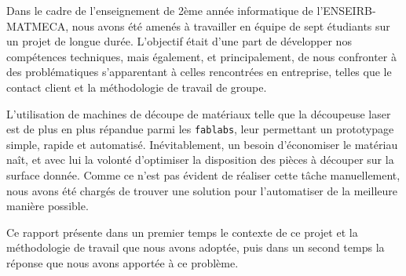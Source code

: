 
Dans le cadre de l'enseignement de 2ème année informatique de l'ENSEIRB-MATMECA, nous avons été amenés à travailler en équipe de sept étudiants sur un projet de longue durée. L'objectif était d'une part de développer nos compétences techniques, mais également, et principalement, de nous confronter à des problématiques s'apparentant à celles rencontrées en entreprise, telles que le contact client et la méthodologie de travail de groupe.

L'utilisation de machines de découpe de matériaux telle que la découpeuse laser est de plus en plus répandue parmi les \texttt{fablabs}, leur permettant un prototypage simple, rapide et automatisé. Inévitablement, un besoin d'économiser le matériau naît, et avec lui la volonté d'optimiser la disposition des pièces à découper sur la surface donnée. Comme ce n'est pas évident de réaliser cette tâche manuellement, nous avons été chargés de trouver une solution pour l'automatiser de la meilleure manière possible.

Ce rapport présente dans un premier temps le contexte de ce projet et la méthodologie de travail que nous avons adoptée, puis dans un second temps la réponse que nous avons apportée à ce problème.

